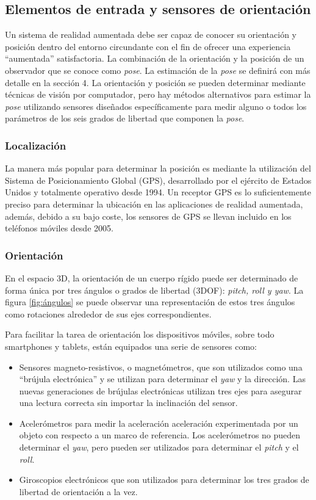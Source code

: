 \subsection{Elementos de entrada y sensores de orientación}
Un sistema de realidad aumentada debe ser capaz de conocer su orientación y posición dentro del entorno circundante con el fin de ofrecer una experiencia ``aumentada'' satisfactoria. La combinación de la orientación y la posición de un observador que se conoce como \emph{pose}. La estimación de la \emph{pose} se definirá con más detalle en la sección 4. La orientación y posición se pueden determinar mediante técnicas de visión por computador, pero hay métodos alternativos para estimar la \emph{pose}  utilizando  sensores diseñados específicamente para medir alguno o todos los parámetros de los seis grados de libertad que componen la \emph{pose}.

\subsubsection{Localización}
La manera más popular para determinar la posición es mediante la utilización del Sistema de Posicionamiento Global (GPS), desarrollado por el ejército de Estados Unidos y totalmente operativo desde 1994. 
Un receptor GPS es lo suficientemente preciso para determinar la ubicación en las aplicaciones de realidad aumentada, además, debido a su bajo coste, los sensores de GPS se llevan incluido en los teléfonos móviles desde 2005.

\subsubsection{Orientación}
En el espacio 3D, la orientación de un cuerpo rígido puede ser determinado de forma única por tres ángulos o grados de libertad (3DOF): \emph{pitch, roll y yaw}. La figura \ref{fig:ángulos}  se puede observar una representación de estos tres ángulos como rotaciones alrededor de sus ejes correspondientes. 

Para facilitar la tarea de orientación los dispositivos móviles, sobre todo smartphones y tablets, están equipados una serie de sensores como:

\begin{itemize}
\item Sensores magneto-resistivos, o magnetómetros, que son utilizados como una ``brújula electrónica'' y se utilizan para determinar el \emph{yaw} y la dirección. Las nuevas generaciones de brújulas electrónicas utilizan tres ejes para asegurar una lectura correcta sin importar la inclinación del sensor.
\item Acelerómetros para medir la aceleración aceleración experimentada por un objeto con respecto a un marco de referencia. Los acelerómetros no pueden determinar el \emph{yaw}, pero pueden ser utilizados para determinar el \emph{pitch} y el \emph{roll}. 
\item Giroscopios electrónicos que son utilizados para determinar los tres grados de libertad de orientación a la vez.
\end{itemize}

